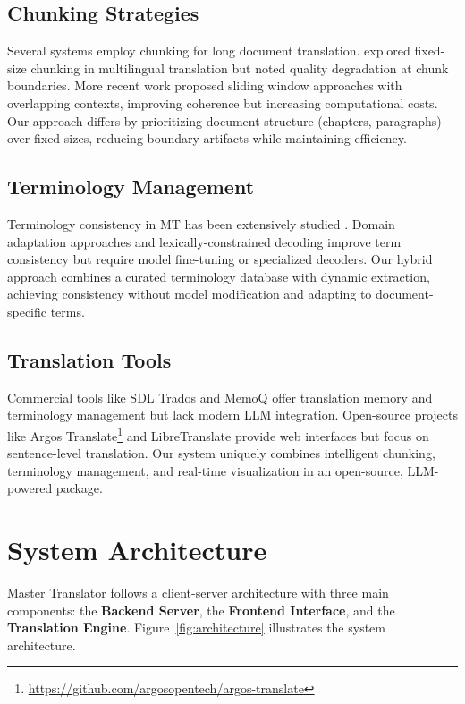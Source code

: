 \documentclass[11pt]{article}
\begin{document}
\subsection{Chunking Strategies}

Several systems employ chunking for long document translation. \citet{koehn2020findings} explored fixed-size chunking in multilingual translation but noted quality degradation at chunk boundaries. More recent work \cite{jiang2023long} proposed sliding window approaches with overlapping contexts, improving coherence but increasing computational costs. Our approach differs by prioritizing document structure (chapters, paragraphs) over fixed sizes, reducing boundary artifacts while maintaining efficiency.

\subsection{Terminology Management}

Terminology consistency in MT has been extensively studied \cite{dinu2019training,bergmanis2021preventing}. Domain adaptation approaches \cite{chu2017empirical} and lexically-constrained decoding \cite{hokamp2017lexically} improve term consistency but require model fine-tuning or specialized decoders. Our hybrid approach combines a curated terminology database with dynamic extraction, achieving consistency without model modification and adapting to document-specific terms.

\subsection{Translation Tools}

Commercial tools like SDL Trados and MemoQ offer translation memory and terminology management but lack modern LLM integration. Open-source projects like Argos Translate\footnote{\url{https://github.com/argosopentech/argos-translate}} and LibreTranslate provide web interfaces but focus on sentence-level translation. Our system uniquely combines intelligent chunking, terminology management, and real-time visualization in an open-source, LLM-powered package.

\section{System Architecture}

Master Translator follows a client-server architecture with three main components: the \textbf{Backend Server}, the \textbf{Frontend Interface}, and the \textbf{Translation Engine}. Figure~\ref{fig:architecture} illustrates the system architecture.
\end{document}
